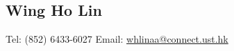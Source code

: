 \documentclass[10pt, oneside]{article}
\begin{document}
%	
\begin{center}
\section*{Wing Ho Lin}
\begin{comment}
\begin{tabular}{p{2.1cm}l}	
	\toprule
	Telephone: & +852 64336027\\
	Email: & \href{mailto:whlinaa@cse.ust.hk}
	{whlinaa@cse.ust.hk}
\end{tabular}	
\end{comment}
Tel: (852) 6433-6027 \qquad Email: \href{mailto:whlinaa@connect.ust.hk}{whlinaa@connect.ust.hk} 

\end{center}
\vspace{-0.8cm}
\end{document}

